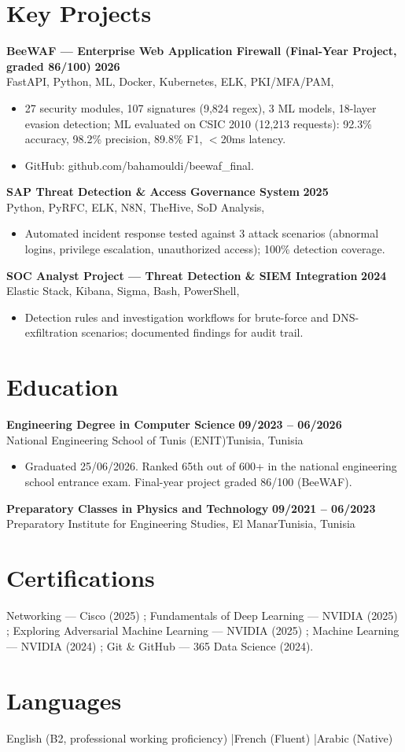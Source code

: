 \documentclass[a4paper,10pt]{article}
\newcommand{\cventry}[4]{\textbf{#1} \hfill \textbf{#4}\\[0.5pt]#2{\ifx\relax#3\relax\else, #3\fi}\par\vspace{0.8pt}}
\begin{document}
\section{Key Projects}
\cventry{BeeWAF --- Enterprise Web Application Firewall (Final-Year Project, graded 86/100)}{FastAPI, Python, ML, Docker, Kubernetes, ELK, PKI/MFA/PAM}{}{2026}
\begin{itemize}
  \item 27 security modules, 107 signatures (9,824 regex), 3 ML models, 18-layer evasion detection; ML evaluated on CSIC 2010 (12,213 requests): 92.3\% accuracy, 98.2\% precision, 89.8\% F1, $<$20ms latency.
  \item GitHub: github.com/bahamouldi/beewaf\_final.
\end{itemize}
\cventry{SAP Threat Detection \& Access Governance System}{Python, PyRFC, ELK, N8N, TheHive, SoD Analysis}{}{2025}
\begin{itemize}
  \item Automated incident response tested against 3 attack scenarios (abnormal logins, privilege escalation, unauthorized access); 100\% detection coverage.
\end{itemize}
\cventry{SOC Analyst Project --- Threat Detection \& SIEM Integration}{Elastic Stack, Kibana, Sigma, Bash, PowerShell}{}{2024}
\begin{itemize}
  \item Detection rules and investigation workflows for brute-force and DNS-exfiltration scenarios; documented findings for audit trail.
\end{itemize}
\section{Education}
\cventry{Engineering Degree in Computer Science}{National Engineering School of Tunis (ENIT)}{Tunisia}{09/2023 -- 06/2026}
\begin{itemize}
  \item Graduated 25/06/2026. Ranked 65th out of 600+ in the national engineering school entrance exam. Final-year project graded 86/100 (BeeWAF).
\end{itemize}
\cventry{Preparatory Classes in Physics and Technology}{Preparatory Institute for Engineering Studies, El Manar}{Tunisia}{09/2021 -- 06/2023}
\section{Certifications}
Networking --- Cisco (2025) ; Fundamentals of Deep Learning --- NVIDIA (2025) ; Exploring Adversarial Machine Learning --- NVIDIA (2025) ; Machine Learning --- NVIDIA (2024) ; Git \& GitHub --- 365 Data Science (2024).
\section{Languages}
English (B2, professional working proficiency) \quad|\quad French (Fluent) \quad|\quad Arabic (Native)
\end{document}
